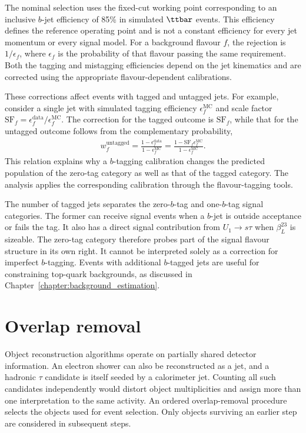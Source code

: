 The nominal selection uses the fixed-cut working point corresponding to an inclusive $b$-jet efficiency of 85\% in simulated $\ttbar$ events.
This efficiency defines the reference operating point and is not a constant efficiency for every jet momentum or every signal model.
For a background flavour $f$, the rejection is $1/\epsilon_f$, where $\epsilon_f$ is the probability of that flavour passing the same requirement.
Both the tagging and mistagging efficiencies depend on the jet kinematics and are corrected using the appropriate flavour-dependent calibrations.

These corrections affect events with tagged and untagged jets.
For example, consider a single jet with simulated tagging efficiency $\epsilon_f^{\mathrm{MC}}$ and scale factor $\mathrm{SF}_f=\epsilon_f^{\mathrm{data}}/\epsilon_f^{\mathrm{MC}}$.
The correction for the tagged outcome is $\mathrm{SF}_f$, while that for the untagged outcome follows from the complementary probability,
\begin{align}
    w_f^{\mathrm{untagged}}
    = \frac{1-\epsilon_f^{\mathrm{data}}}
           {1-\epsilon_f^{\mathrm{MC}}}
    = \frac{1-\mathrm{SF}_f\epsilon_f^{\mathrm{MC}}}
           {1-\epsilon_f^{\mathrm{MC}}}.
    \label{eq:ch6_btag_untagged}
\end{align}
This relation explains why a $b$-tagging calibration changes the predicted population of the zero-tag category as well as that of the tagged category.
The analysis applies the corresponding calibration through the flavour-tagging tools.

The number of tagged jets separates the zero-$b$-tag and one-$b$-tag signal categories.
The former can receive signal events when a $b$-jet is outside acceptance or fails the tag.
It also has a direct signal contribution from $U_1\rightarrow s\tau$ when $\beta_L^{23}$ is sizeable.
The zero-tag category therefore probes part of the signal flavour structure in its own right.
It cannot be interpreted solely as a correction for imperfect $b$-tagging.
Events with additional $b$-tagged jets are useful for constraining top-quark backgrounds, as discussed in Chapter~\ref{chapter:background_estimation}.

\section{Overlap removal}
\label{sec:ch6_overlap}

Object reconstruction algorithms operate on partially shared detector information.
An electron shower can also be reconstructed as a jet, and a hadronic $\tau$ candidate is itself seeded by a calorimeter jet.
Counting all such candidates independently would distort object multiplicities and assign more than one interpretation to the same activity.
An ordered overlap-removal procedure selects the objects used for event selection.
Only objects surviving an earlier step are considered in subsequent steps.

